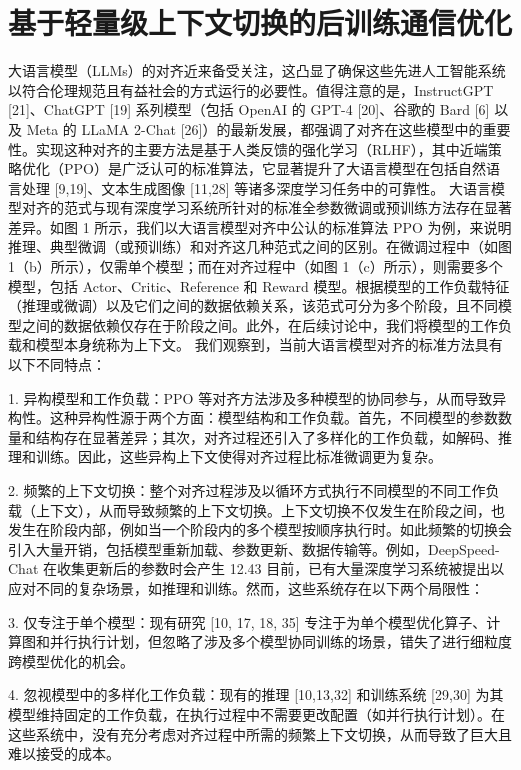 
\chapter{基于轻量级上下文切换的后训练通信优化}


大语言模型（LLMs）的对齐近来备受关注，这凸显了确保这些先进人工智能系统以符合伦理规范且有益社会的方式运行的必要性。值得注意的是，InstructGPT [21]、ChatGPT [19] 系列模型（包括 OpenAI 的 GPT-4 [20]、谷歌的 Bard [6] 以及 Meta 的 LLaMA 2-Chat [26]）的最新发展，都强调了对齐在这些模型中的重要性。实现这种对齐的主要方法是基于人类反馈的强化学习（RLHF），其中近端策略优化（PPO）是广泛认可的标准算法，它显著提升了大语言模型在包括自然语言处理 [9,19]、文本生成图像 [11,28] 等诸多深度学习任务中的可靠性。 
大语言模型对齐的范式与现有深度学习系统所针对的标准全参数微调或预训练方法存在显著差异。如图 1 所示，我们以大语言模型对齐中公认的标准算法 PPO 为例，来说明推理、典型微调（或预训练）和对齐这几种范式之间的区别。在微调过程中（如图 1（b）所示），仅需单个模型；而在对齐过程中（如图 1（c）所示），则需要多个模型，包括 Actor、Critic、Reference 和 Reward 模型。根据模型的工作负载特征（推理或微调）以及它们之间的数据依赖关系，该范式可分为多个阶段，且不同模型之间的数据依赖仅存在于阶段之间。此外，在后续讨论中，我们将模型的工作负载和模型本身统称为上下文。 
我们观察到，当前大语言模型对齐的标准方法具有以下不同特点： 

1.	异构模型和工作负载：PPO 等对齐方法涉及多种模型的协同参与，从而导致异构性。这种异构性源于两个方面：模型结构和工作负载。首先，不同模型的参数数量和结构存在显著差异；其次，对齐过程还引入了多样化的工作负载，如解码、推理和训练。因此，这些异构上下文使得对齐过程比标准微调更为复杂。 

2.	频繁的上下文切换：整个对齐过程涉及以循环方式执行不同模型的不同工作负载（上下文），从而导致频繁的上下文切换。上下文切换不仅发生在阶段之间，也发生在阶段内部，例如当一个阶段内的多个模型按顺序执行时。如此频繁的切换会引入大量开销，包括模型重新加载、参数更新、数据传输等。例如，DeepSpeed-Chat 在收集更新后的参数时会产生 12.43%
目前，已有大量深度学习系统被提出以应对不同的复杂场景，如推理和训练。然而，这些系统存在以下两个局限性： 

3.	仅专注于单个模型：现有研究 [10, 17, 18, 35] 专注于为单个模型优化算子、计算图和并行执行计划，但忽略了涉及多个模型协同训练的场景，错失了进行细粒度跨模型优化的机会。 

4.	忽视模型中的多样化工作负载：现有的推理 [10,13,32] 和训练系统 [29,30] 为其模型维持固定的工作负载，在执行过程中不需要更改配置（如并行执行计划）。在这些系统中，没有充分考虑对齐过程中所需的频繁上下文切换，从而导致了巨大且难以接受的成本。 

